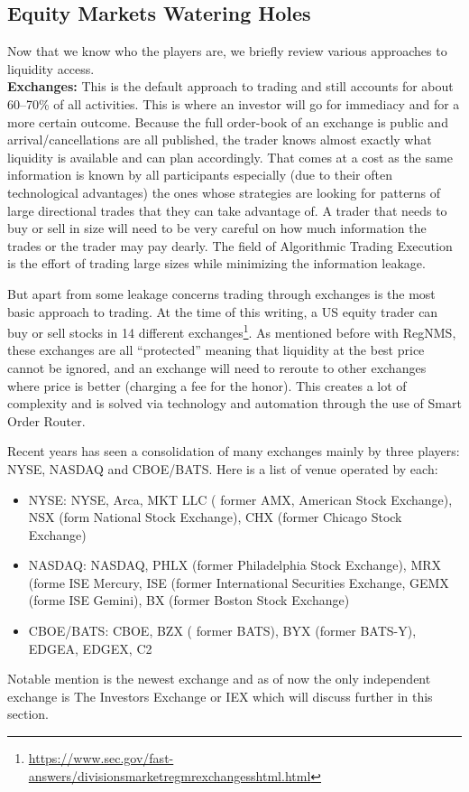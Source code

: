 \subsection{Equity Markets Watering Holes}


Now that we know who the players are, we briefly review various approaches to liquidity access. \\


\noindent\textbf{Exchanges:} This is the default approach to trading and still accounts for about 60--70\% of all activities. This is where an investor will go for immediacy and for a more certain outcome. Because the full order-book of an exchange is public and arrival/cancellations are all published, the trader knows almost exactly what liquidity is available and can plan accordingly. That comes at a cost as the same information is known by all participants especially (due to their often technological advantages) the ones whose strategies are looking for patterns of large directional trades that they can take advantage of. A trader that needs to buy or sell in size will need to be very careful on how much information the trades or the trader may pay dearly. The field of Algorithmic Trading Execution is the effort of trading large sizes while minimizing the information leakage. 


But apart from some leakage concerns trading through exchanges is the most basic approach to trading. At the time of this writing, a US equity trader can buy or sell stocks in 14 different exchanges\footnote{\url{https://www.sec.gov/fast-answers/divisionsmarketregmrexchangesshtml.html}}. As mentioned before with RegNMS, these exchanges are all ``protected'' meaning that liquidity at the best price cannot be ignored, and an exchange will need to reroute to other exchanges where price is better (charging a fee for the honor). This creates a lot of complexity and is solved via technology and automation through the use of Smart Order Router.


Recent years has seen a consolidation of many exchanges mainly by three players: NYSE, NASDAQ and CBOE/BATS. Here is a list of venue operated by each:
        \begin{itemize}
        \item NYSE: NYSE, Arca, MKT LLC ( former AMX, American Stock Exchange), NSX (form National Stock Exchange), CHX (former Chicago Stock Exchange)
        \item NASDAQ:  NASDAQ, PHLX (former Philadelphia Stock Exchange), MRX (forme ISE Mercury, ISE (former International Securities Exchange, GEMX (forme ISE Gemini), BX (former Boston Stock Exchange)
        \item CBOE/BATS: CBOE, BZX ( former BATS), BYX (former BATS-Y), EDGEA, EDGEX, C2
        \end{itemize}
Notable mention is the newest exchange and as of now the only independent exchange is The Investors Exchange or IEX which will discuss further in this section.



